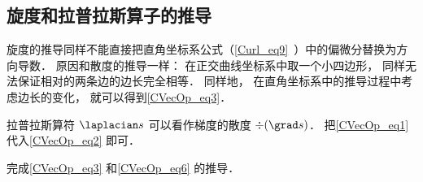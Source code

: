 \subsection{旋度和拉普拉斯算子的推导}
旋度的推导同样不能直接把直角坐标系公式（\autoref{Curl_eq9}~）中的偏微分替换为方向导数． 原因和散度的推导一样： 在正交曲线坐标系中取一个小四边形， 同样无法保证相对的两条边的边长完全相等． 同样地， 在直角坐标系中的推导过程中考虑边长的变化， 就可以得到\autoref{CVecOp_eq3}．

拉普拉斯算符 $\laplacian s$ 可以看作梯度的散度 $\div (\grad s)$． 把\autoref{CVecOp_eq1} 代入\autoref{CVecOp_eq2} 即可．

\begin{exercise}{}
完成\autoref{CVecOp_eq3} 和\autoref{CVecOp_eq6} 的推导．
\end{exercise}
